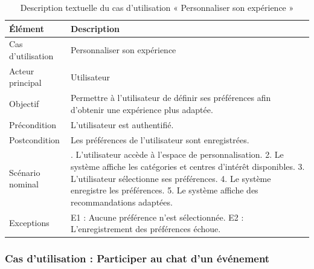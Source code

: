 \begin{table}[H]
\centering
\caption{Description textuelle du cas d’utilisation « Personnaliser son expérience »}
\label{tableau:5-2}
\renewcommand{\arraystretch}{1.2}
\begin{tabularx}{\textwidth}{|>{\raggedright\arraybackslash}X|>{\raggedright\arraybackslash}X|}
\hline
\rowcolor[HTML]{ECF4FF}
\textbf{Élément} & \textbf{Description} \\
\hline
Cas d’utilisation & Personnaliser son expérience \\
\hline
Acteur principal & Utilisateur \\
\hline
Objectif & Permettre à l’utilisateur de définir ses préférences afin d’obtenir une expérience plus adaptée. \\
\hline
Précondition & L’utilisateur est authentifié. \\
\hline
Postcondition & Les préférences de l’utilisateur sont enregistrées. \\
\hline
Scénario nominal & 1. L’utilisateur accède à l’espace de personnalisation.\newline{} 2. Le système affiche les catégories et centres d’intérêt disponibles.\newline{} 3. L’utilisateur sélectionne ses préférences.\newline{} 4. Le système enregistre les préférences.\newline{} 5. Le système affiche des recommandations adaptées. \\
\hline
Exceptions & E1 : Aucune préférence n’est sélectionnée.\newline{} E2 : L’enregistrement des préférences échoue. \\
\hline
\end{tabularx}
\end{table}


\subsubsection{Cas d’utilisation : Participer au chat d’un événement}


